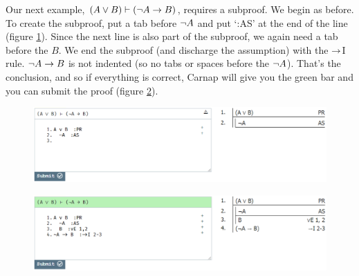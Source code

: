 Our next example, $(A \vee B) \vdash ({\neg} A \rightarrow B)$, requires a subproof. We begin as before. To create the subproof, put a tab before ${\neg} A$ and put `:AS' at the end of the line (figure \ref{fig:proof-2a}). Since the next line is also part of the subproof, we again need a tab before the $B$. We end the subproof (and discharge the assumption) with the $\rightarrow$I rule. ${\neg} A \rightarrow B$ is not indented (so no tabs or spaces before the ${\neg} A$). That's the conclusion, and so if everything is correct, Carnap will give you the green bar and you can submit the proof (figure \ref{fig:proof-2b}). 

\begin{figure}[h]
\includegraphics[width=13cm]{textbook--2a.PNG}
\caption{}
\label{fig:proof-2a}
\end{figure}

\begin{figure}[h]
\includegraphics[width=13cm]{textbook--2b.PNG}
\caption{}
\label{fig:proof-2b}
\end{figure}

